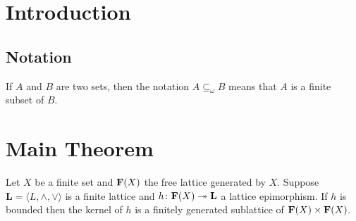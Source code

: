 \author[N.~Ru\v{s}kuc]{Nik Ru\v{s}kuc}


\date{\today}



\maketitle
\section{Introduction}
\subsection{Notation}
\newcommand\finsub{\ensuremath{\subseteq_{\omega}}}
If $A$ and $B$ are two sets, then the notation $A \finsub B$ means 
that $A$ is a finite subset of $B$.

\section{Main Theorem}


\begin{theorem}
\label{thm:forward}
Let $X$ be a finite set and $\mathbf{F} (X)$ the free lattice 
generated by $X$.  
Suppose $\mathbf L = \langle L, \wedge, \vee\rangle$ is a finite lattice and 
$h\colon \mathbf{F}(X) \twoheadrightarrow \mathbf{L}$ a lattice epimorphism.
If $h$ is bounded then the kernel of $h$ is a finitely generated sublattice 
of $\mathbf{F} (X) \times \mathbf{F} (X)$.
\end{theorem}

